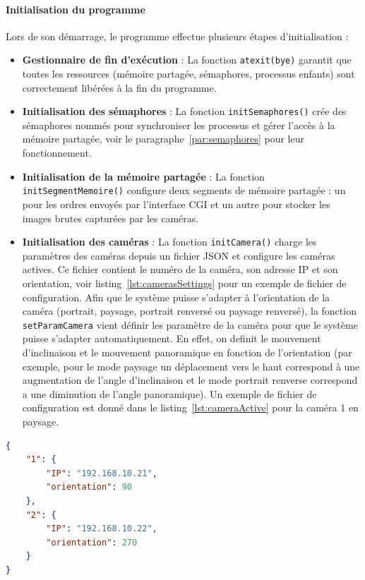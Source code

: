 \documentclass[a4paper, 11pt, french]{article}
\begin{document}
\paragraph{Initialisation du programme}
Lors de son démarrage, le programme effectue plusieurs étapes d'initialisation :
\begin{itemize}
    \item \textbf{Gestionnaire de fin d'exécution} : La fonction \texttt{atexit(bye)} garantit que toutes les ressources (mémoire partagée, sémaphores, processus enfants) sont correctement libérées à la fin du programme.
    \item \textbf{Initialisation des sémaphores} : La fonction \texttt{initSemaphores()} crée des sémaphores nommés pour synchroniser les processus et gérer l'accès à la mémoire partagée, voir le paragraphe~\ref{par:semaphores} pour leur fonctionnement.
    \item \textbf{Initialisation de la mémoire partagée} : La fonction \texttt{initSegmentMemoire()} configure deux segments de mémoire partagée : un pour les ordres envoyés par l'interface CGI et un autre pour stocker les images brutes capturées par les caméras.
    \item \textbf{Initialisation des caméras} : La fonction \texttt{initCamera()} charge les paramètres des caméras depuis un fichier JSON et configure les caméras actives. Ce fichier contient le numéro de la caméra, son adresse IP et son orientation, voir listing~\ref{lst:camerasSettings} pour un exemple de fichier de configuration.
    Afin que le système puisse s'adapter à l'orientation de la caméra (portrait, paysage, portrait renversé ou paysage renversé), la fonction \texttt{setParamCamera} vient définir les paramètre de la caméra pour que le système puisse s'adapter automatiquement. En effet, on definit le mouvement d'inclinaison et le mouvement panoramique en fonction de l'orientation (par exemple, pour le mode paysage un déplacement vers le haut correspond à une augmentation de l'angle d'inclinaison et le mode portrait renverse correspond a une diminution de l'angle panoramique). Un exemple de fichier de configuration est donné dans le listing~\ref{lst:cameraActive} pour la caméra 1 en paysage.
\end{itemize}

\begin{lstlisting}[language=json, caption={Fichier json pour définir les caméras, \texttt{cameras.json}}, label={lst:camerasSettings}]
{
    "1": {
        "IP": "192.168.10.21",
        "orientation": 90
    },
    "2": {
        "IP": "192.168.10.22",
        "orientation": 270
    }
}
\end{lstlisting}
\end{document}
